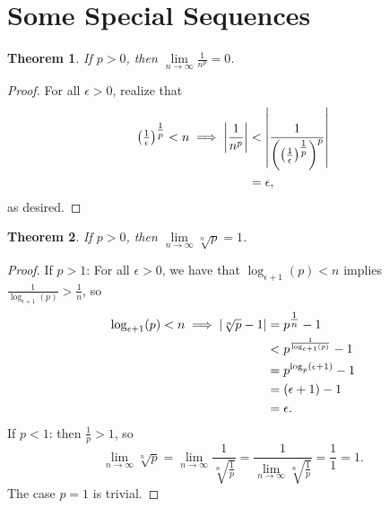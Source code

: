 \documentclass[11pt]{article}
\newtheorem{theorem}{Theorem}
\begin{document}

\section{Some Special Sequences}

\begin{theorem}
	If $p > 0$, then $\lim\limits_{n \to \infty} \frac{1}{n^{p}} = 0$.
\end{theorem}
\begin{adjustwidth}{0.5cm}{}
	\begin{proof}
		For all $\epsilon > 0$, realize that
		\begin{align*}
			\left( \tfrac{1}{\epsilon} \right)^{\tfrac{1}{p}} < n \implies \abs{\frac{1}{n^{p}}} & < \abs{\frac{1}{\left(\left( \tfrac{1}{\epsilon} \right)^{\tfrac{1}{p}}\right)^{p}}} \\
			                                                                                     & = \epsilon,
		\end{align*}
		as desired.
	\end{proof}
\end{adjustwidth}

\begin{theorem}
	If $p > 0$, then $\lim\limits_{n \to \infty} \sqrt[n]{p} = 1$.
\end{theorem}
\begin{adjustwidth}{0.5cm}{}
	\begin{proof}
		If $p > 1$: For all $\epsilon > 0$, we have that $\log_{\epsilon + 1}(p) < n$ implies $\tfrac{1}{\log_{\epsilon + 1}(p)} > \tfrac{1}{n}$, so
		\begin{align*}
			\log_{\epsilon + 1}(p) < n \implies \abs{\sqrt[n]{p} - 1} & = p^{\tfrac{1}{n}} - 1                        \\
			                                                          & < p^{\frac{1}{\log_{\epsilon + 1}(p)}} - 1    \\
			                                                          & = p^{\log_{p} \left(\epsilon + 1 \right)} - 1 \\
			                                                          & = \left( \epsilon + 1 \right) - 1             \\
			                                                          & = \epsilon.
		\end{align*}
		If $p < 1$: then $\tfrac{1}{p} > 1$, so
		\[
			\lim\limits_{n \to \infty} \sqrt[n]{p} = \lim\limits_{n \to \infty} \frac{1}{\sqrt[n]{\tfrac{1}{p}}} = \frac{1}{\lim\limits_{n \to \infty} \sqrt[n]{\tfrac{1}{p}}} = \frac{1}{1} = 1.
		\]
		The case $p = 1$ is trivial.
	\end{proof}
\end{adjustwidth}
\end{document}
